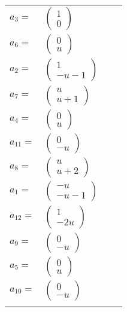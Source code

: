 \documentclass[1p]{elsarticle_modified}
\theoremstyle{definition}
\begin{document}
\begin{tabular}{m{7pt} m{180pt} m{7pt} m{180pt} }
\flushright $a_{3}=$&$\begin{pmatrix}1\\0\end{pmatrix}$ \\
\flushright $a_{6}=$&$\begin{pmatrix}0\\u\end{pmatrix}$ \\
\flushright $a_{2}=$&$\begin{pmatrix}1\\- u-1\end{pmatrix}$ \\
\flushright $a_{7}=$&$\begin{pmatrix}u\\u+1\end{pmatrix}$ \\
\flushright $a_{4}=$&$\begin{pmatrix}0\\u\end{pmatrix}$ \\
\flushright $a_{11}=$&$\begin{pmatrix}0\\- u\end{pmatrix}$ \\
\flushright $a_{8}=$&$\begin{pmatrix}u\\u+2\end{pmatrix}$ \\
\flushright $a_{1}=$&$\begin{pmatrix}- u\\- u-1\end{pmatrix}$ \\
\flushright $a_{12}=$&$\begin{pmatrix}1\\-2 u\end{pmatrix}$ \\
\flushright $a_{9}=$&$\begin{pmatrix}0\\- u\end{pmatrix}$ \\
\flushright $a_{5}=$&$\begin{pmatrix}0\\u\end{pmatrix}$ \\
\flushright $a_{10}=$&$\begin{pmatrix}0\\- u\end{pmatrix}$\\&\end{tabular}
\end{document}
